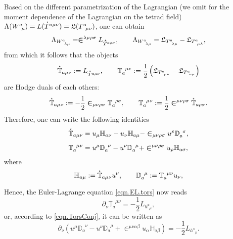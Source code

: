 \documentclass[
10pt, %
a4paper, %
oneside, %
headinclude,footinclude, %
BCOR5mm, %
]{scrartcl}
\newcommand{\pd}[1]{\partial_{#1}}
\newcommand{\tetrsymbol}{h}
\newcommand{\tetr}[2]{\tetrsymbol^{#1}_{\phantom{#1}#2}}
\newcommand{\D}[1]{\partial_{#1}} %
\newcommand{\Tors}[2]{T^{#1}_{\phantom{a}#2}}
\newcommand{\w}[2]{W^{#1}_{\phantom{#1}#2}}
\newcommand{\Lag}{\Lambda}	%
\newcommand{\Laghodge}{L}%
\newcommand{\Lagtors}{\mathfrak{L}}%
\newcommand{\LCsymb}{\bm{\in}}    %
\newcommand{\HDT}[1]{\accentset{\star}{T}^{#1}}
\newcommand{\TorsConj}[2]{\mathbb{T}_{#1}^{\phantom{#1}#2}}
\newcommand{\HTConj}[1]{\accentset{\star}{\mathbb{T}}_{#1}}
\newcommand{\Dbb}[2]{\mathbb{D}_{#1}^{\phantom{#1}#2}}
\newcommand{\Hbb}[2]{\mathbb{H}_{#1#2}}
\begin{document}
Based on the different parametrization of the Lagrangian (we omit for the moment dependence of the 
Lagrangian on the tetrad field) $ \Lag(\w{a}{\mu}) = 
\Laghodge(\HDT{a\mu\nu}) = \Lagtors(\Tors{a}{\mu\nu}) $, one can obtain
\begin{equation}\label{eqn.Lambda_W.Hodge}
	\Lag_{\w{a}{\lambda\mu}} = \LCsymb^{\lambda\mu\rho\sigma} \Laghodge_{\HDT{a\rho\sigma}},
	\qquad
	\Lag_{\w{a}{\lambda\mu}} = \Lagtors_{\Tors{a}{\lambda\mu}} - \Lagtors_{\Tors{a}{\mu\lambda}},
\end{equation}
from which it follows that the objects
\begin{equation}
	\HTConj{a\mu\nu} := \Laghodge_{\HDT{a\mu\nu}}, 
	\qquad
	\TorsConj{a}{\mu\nu} := \frac12 \left( \Lagtors_{\Tors{a}{\mu\nu}} - \Lagtors_{\Tors{a}{\nu\mu}} 
	\right)
\end{equation}
are Hodge duals of each others:
\begin{equation}
	\HTConj{a\mu\nu} :=-\frac12\LCsymb_{\mu\nu\rho\sigma}\TorsConj{a}{\rho\sigma}, 
	\qquad
	\TorsConj{a}{\mu\nu} := \frac12 \LCsymb^{\mu\nu\rho\sigma}\HTConj{a\rho\sigma}.
\end{equation}
 Therefore, one can write the following identities
\begin{subequations}
	\begin{align}
		\HTConj{a\mu\nu} &= u_\mu \Hbb{a}{\nu} - u_\nu \Hbb{a}{\mu} - 
	\LCsymb_{\mu\nu\rho\sigma}u^\rho \Dbb{a}{\sigma}\label{app.eqn.Deqn1},\\[2mm]
	\TorsConj{a}{\mu\nu} &= u^\mu \Dbb{a}{\nu} - u^\nu \Dbb{a}{\mu} +
	\LCsymb^{\mu\nu\rho\sigma}u_\rho \Hbb{a}{\sigma},\label{eqn.TorsConj}
	\end{align}
\end{subequations}
where 
\begin{equation}\label{app.eqn.DH}
	\Hbb{a}{\mu} := \HTConj{a\mu\nu}u^\nu, 
	\qquad
	\Dbb{a}{\mu} := \TorsConj{a}{\mu\nu}u_\nu,
\end{equation}

Hence, the Euler-Lagrange equation \eqref{eqn.EL.tors} now reads
\begin{equation}%
	\pd{\nu} \TorsConj{a}{\mu\nu} =-\frac12 \Laghodge_{\tetr{a}{\mu}},
\end{equation}
or, according to \eqref{eqn.TorsConj}, it can be written as
\begin{equation}\label{app.eqn.Deqn2}
	\D{\nu}(u^\mu \Dbb{a}{\nu} - u^\nu \Dbb{a}{\mu} + \LCsymb^{\mu\nu\alpha\beta}
	u_\alpha\Hbb{a}{\beta}) = -\frac12 \Laghodge_{\tetr{a}{\mu}}.
\end{equation}
\end{document}
